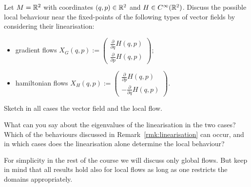 \begin{exercise}\label{exe:gradham}
	Let $M=\mathbb{R}^2$ with coordinates $(q,p)\in\mathbb{R}^2$ and $H\in C^\infty(\mathbb{R}^2)$.
	Discuss the possible local behaviour near the fixed-points of the following types of vector fields by considering their linearisation:
	\begin{itemize}
		\item gradient flows $\displaystyle X_G(q,p) := \begin{pmatrix}\frac{\partial}{\partial q} H(q,p)\\\frac{\partial}{\partial p} H(q,p)\end{pmatrix}$;
		\item hamiltonian flows $\displaystyle X_H(q,p) := \begin{pmatrix}\frac{\partial}{\partial p} H(q,p)\\-\frac{\partial}{\partial q} H(q,p)\end{pmatrix}$.
	\end{itemize}
	Sketch in all cases the vector field and the local flow.

	What can you say about the eigenvalues of the linearisation in the two cases?
	Which of the behaviours discussed in Remark~\ref{rmk:linearisation} can occur, and in which cases does the linearisation alone determine the local behaviour?
\end{exercise}


\begin{tcolorbox}
	For simplicity in the rest of the course we will discuss only global flows.
	But keep in mind that all results hold also for local flows as long as one restricts the domains appropriately.
\end{tcolorbox}
